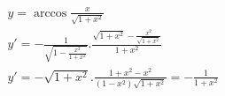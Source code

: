 \begin{ex}
\begin{align}
&y=\arccos{\frac{x}{\sqrt{1+x^2}}}\nonumber\\
&y'=-\frac{1}{\sqrt{1-\frac{x^2}{1+x^2}}}.\frac{\sqrt{1+x^2}-\frac{x^2}{\sqrt{1+x^2}}}{1+x^2}\nonumber\\
&y'=-\sqrt{1+x^2}.\frac{1+x^2-x^2}{(1-x^2)\sqrt{1+x^2}}=-\frac{1}{1+x^2}\nonumber
\end{align}
\end{ex}
